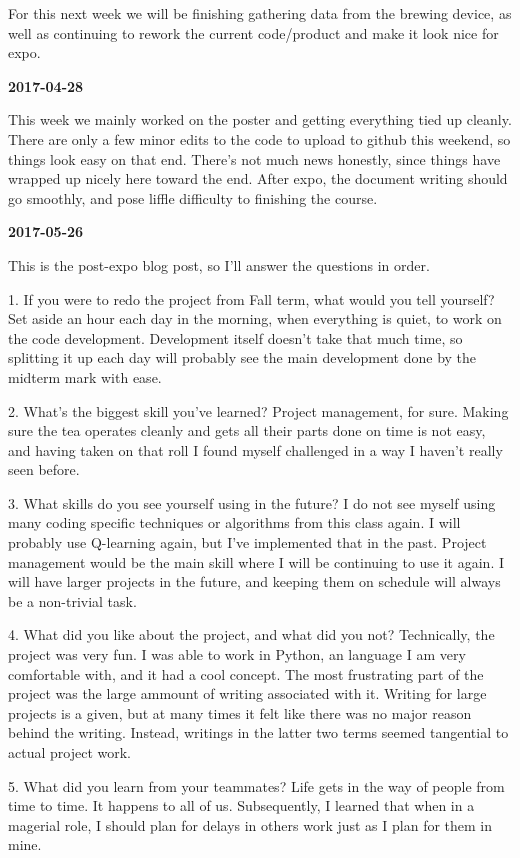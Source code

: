 For this next week we will be finishing gathering data from the brewing device, as well as continuing to rework the current code/product and make it look nice for expo.

\textbf{2017-04-28}

This week we mainly worked on the poster and getting everything tied up cleanly. There are only a few minor edits to the code to upload to github this weekend, so things look easy on that end. There's not much news honestly, since things have wrapped up nicely here toward the end. After expo, the document writing should go smoothly, and pose liffle difficulty to finishing the course.

\textbf{2017-05-26}

This is the post-expo blog post, so I'll answer the questions in order.

1. If you were to redo the project from Fall term, what would you tell yourself?
Set aside an hour each day in the morning, when everything is quiet, to work on the code development. Development itself doesn't take that much time, so splitting it up each day will probably see the main development done by the midterm mark with ease.

2. What's the biggest skill you've learned?
Project management, for sure. Making sure the tea operates cleanly and gets all their parts done on time is not easy, and having taken on that roll I found myself challenged in a way I haven't really seen before.

3. What skills do you see yourself using in the future?
I do not see myself using many coding specific techniques or algorithms from this class again. I will probably use Q-learning again, but I've implemented that in the past. Project management would be the main skill where I will be continuing to use it again. I will have larger projects in the future, and keeping them on schedule will always be a non-trivial task.

4. What did you like about the project, and what did you not?
Technically, the project was very fun. I was able to work in Python, an language I am very comfortable with, and it had a cool concept. The most frustrating part of the project was the large ammount of writing associated with it. Writing for large projects is a given, but at many times it felt like there was no major reason behind the writing. Instead, writings in the latter two terms seemed tangential to actual project work.

5. What did you learn from your teammates?
Life gets in the way of people from time to time. It happens to all of us. Subsequently, I learned that when in a magerial role, I should plan for delays in others work just as I plan for them in mine.

